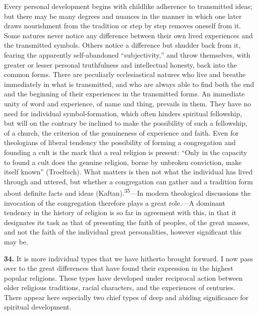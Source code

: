 \documentclass[12pt,a4paper]{book}
\newcommand{\opage}[1]{\marginnote{\footnotesize\textit{[#1]}}}
\begin{document}
Every personal development begins with childlike adherence to transmitted ideas;
but there may be many degrees and nuances in the manner in which one later draws
nourishment from the tradition or step by step removes oneself from it. Some
natures never notice any difference between their own lived experiences and the
transmitted symbols. Others notice a difference but shudder back from it, fearing
the apparently self-abandoned ``subjectivity,'' and throw themselves, with greater
or lesser personal truthfulness and intellectual honesty, back into the common
forms. There are peculiarly ecclesiastical natures who live and breathe immediately
in what is transmitted, and who are always able to find both the end and the
beginning of their experiences in the transmitted forms. An immediate unity of word
and experience, of name and thing, prevails in them. They have no need for
individual symbol-formation, which often hinders spiritual fellowship, but will on
the contrary be inclined to make the possibility of such a fellowship, of a church,
the criterion of the 
\opage{81}genuineness of experience and faith. Even for theologians of
liberal tendency the possibility of forming a congregation and founding a cult is
the mark that a real religion is present: ``Only in the capacity to found a cult
does the genuine religion, borne by unbroken conviction, make itself known''
(Troeltsch). What matters is then not what the individual has lived through and
uttered, but whether a congregation can gather and a tradition form about definite
facts and ideas (Kaftan).\textsuperscript{35}---In modern theological discussions
the invocation of the congregation therefore plays a great role.---A dominant
tendency in the history of religion is so far in agreement with this, in that it
designates its task as that of presenting the faith of peoples, of the great
masses, and not the faith of the individual great personalities, however
significant this may be.

\medskip

\noindent\textbf{34.} It is more individual types that we have hitherto brought
forward. I now pass over to the great differences that have found their expression
in the highest popular religions. These types have developed under reciprocal
action between older religious traditions, racial characters, and the experiences
of centuries. There appear here especially two chief types of deep and abiding
significance for spiritual development.
\end{document}
